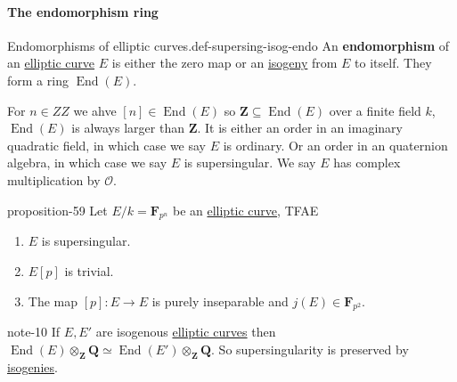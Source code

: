 \documentclass[10pt,]{book}
\newcommand{\terminology}[1]{\textbf{#1}}
\numberwithin{equation}{section}
\newcommand{\lb}{[}
\newcommand{\rb}{]}
\newcommand{\ZZ}{\mathbf{Z}}
\newcommand{\QQ}{\mathbf{Q}}
\newcommand{\FF}{\mathbf{F}}
\newcommand{\ints}{\mathcal{O}}
\DeclareMathOperator{\End}{End}
\begin{document}
\paragraph[{The endomorphism ring}]{The endomorphism ring}\hypertarget{paragraphs-23}{}
\begin{definition}{Endomorphisms of elliptic curves.}{def-supersing-isog-endo}%
\hypertarget{p-796}{}%
An \terminology{endomorphism} of an \hyperref[def-supersing-isog-ec]{elliptic curve} \(E\) is either the zero map or an \hyperref[def-supersing-isog-isog]{isogeny} from \(E\) to itself. They form a ring \(\End(E)\).%
\end{definition}
\hypertarget{p-797}{}%
For \(n \in ZZ\) we ahve \(\lb n \rb \in \End(E)\) so \(\ZZ \subseteq \End(E)\) over a finite field \(k\), \(\End(E)\) is always larger than \(\ZZ\). It is either an order in an imaginary quadratic field, in which case we say \(E\) is ordinary. Or an order in an quaternion algebra, in which case we say \(E\) is supersingular. We say \(E\) has complex multiplication by \(\ints\).%
\begin{proposition}{}{}{proposition-59}%
\hypertarget{p-798}{}%
Let \(E/k = \FF_{p^n}\) be an \hyperref[def-supersing-isog-ec]{elliptic curve}, TFAE\leavevmode%
\begin{enumerate}
\item\hypertarget{li-192}{}\(E\) is supersingular.%
\item\hypertarget{li-193}{}\(E\lb p\rb\) is trivial.%
\item\hypertarget{li-194}{}The map \(\lb p\rb \colon E\to E\) is purely inseparable and \(j(E) \in \FF_{p^2}\).%
\end{enumerate}
%
\end{proposition}
\begin{note}{}{note-10}%
\hypertarget{p-799}{}%
If \(E,E'\) are isogenous \hyperref[def-supersing-isog-ec]{elliptic curves} then \(\End(E) \otimes_\ZZ \QQ \simeq \End(E')\otimes_\ZZ \QQ\). So supersingularity is preserved by \hyperref[def-supersing-isog-isog]{isogenies}.%
\end{note}
%
%
\typeout{************************************************}
\typeout{************************************************}
%
\end{document}
